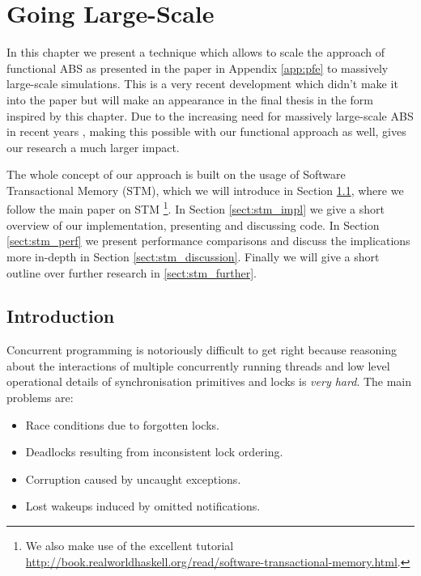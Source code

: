 \chapter{Going Large-Scale}
\label{chap:stm}

In this chapter we present a technique which allows to scale the approach of functional ABS as presented in the paper in Appendix \ref{app:pfe} to massively large-scale simulations. This is a very recent development which didn't make it into the paper but will make an appearance in the final thesis in the form inspired by this chapter. Due to the increasing need for massively large-scale ABS in recent years \cite{lysenko_framework_2008}, making this possible with our functional approach as well, gives our research a much larger impact.

The whole concept of our approach is built on the usage of Software Transactional Memory (STM), which we will introduce in Section \ref{sect:stm_intro}, where we follow the main paper \cite{harris_composable_2005} on STM \footnote{We also make use of the excellent tutorial \url{http://book.realworldhaskell.org/read/software-transactional-memory.html}.}. In Section \ref{sect:stm_impl} we give a short overview of our implementation, presenting and discussing code. In Section \ref{sect:stm_perf} we present performance comparisons and discuss the implications more in-depth in Section \ref{sect:stm_discussion}. Finally we will give a short outline over further research in \ref{sect:stm_further}.

\section{Introduction}
\label{sect:stm_intro}
Concurrent programming is notoriously difficult to get right because reasoning about the interactions of multiple concurrently running threads and low level operational details of synchronisation primitives and locks is \textit{very hard}. The main problems are:

\begin{itemize}
	\item Race conditions due to forgotten locks.
	\item Deadlocks resulting from inconsistent lock ordering.
	\item Corruption caused by uncaught exceptions.
	\item Lost wakeups induced by omitted notifications.
\end{itemize}

